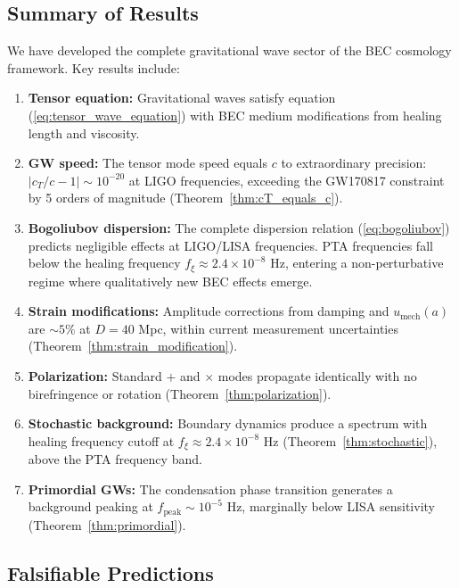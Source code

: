 \documentclass[11pt,a4paper]{article}
\newcommand{\cT}{\ensuremath{c_T}}
\newcommand{\umech}{\ensuremath{u_{\mathrm{mech}}}}
\theoremstyle{definition}
\theoremstyle{remark}
\begin{document}
\subsection{Summary of Results}
\label{sec:summary}

We have developed the complete gravitational wave sector of the BEC cosmology framework. Key results include:

\begin{enumerate}[leftmargin=*, itemsep=0.3em]
\item \textbf{Tensor equation:} Gravitational waves satisfy equation (\ref{eq:tensor_wave_equation}) with BEC medium modifications from healing length and viscosity.

\item \textbf{GW speed:} The tensor mode speed equals $c$ to extraordinary precision: $|\cT/c - 1| \sim 10^{-20}$ at LIGO frequencies, exceeding the GW170817 constraint by 5 orders of magnitude (Theorem~\ref{thm:cT_equals_c}).

\item \textbf{Bogoliubov dispersion:} The complete dispersion relation (\ref{eq:bogoliubov}) predicts negligible effects at LIGO/LISA frequencies. PTA frequencies fall below the healing frequency $f_\xi \approx 2.4 \times 10^{-8}$ Hz, entering a non-perturbative regime where qualitatively new BEC effects emerge.

\item \textbf{Strain modifications:} Amplitude corrections from damping and $\umech(a)$ are $\sim 5\%$ at $D = 40$ Mpc, within current measurement uncertainties (Theorem~\ref{thm:strain_modification}).

\item \textbf{Polarization:} Standard $+$ and $\times$ modes propagate identically with no birefringence or rotation (Theorem~\ref{thm:polarization}).

\item \textbf{Stochastic background:} Boundary dynamics produce a spectrum with healing frequency cutoff at $f_\xi \approx 2.4 \times 10^{-8}$ Hz (Theorem~\ref{thm:stochastic}), above the PTA frequency band.

\item \textbf{Primordial GWs:} The condensation phase transition generates a background peaking at $f_{\mathrm{peak}} \sim 10^{-5}$ Hz, marginally below LISA sensitivity (Theorem~\ref{thm:primordial}).
\end{enumerate}

\subsection{Falsifiable Predictions}
\label{sec:falsifiable}
\end{document}
